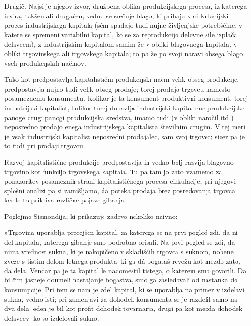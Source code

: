 \documentclass[kapital_02.tex]{subfiles}
\begin{document}
Drugič. Najsi je njegov izvor, družbena oblika produkcijskega procesa, iz katerega izvira, takšen ali drugačen, vedno se srečuje blago, ki prihaja v cirkulacijski proces industrijskega kapitala (s\`em spadajo tudi nujne življenjske potrebščine, v katere se spremeni variabilni kapital, ko se za reprodukcijo delovne sile izplača delavcem), z industrijskim \KPEstran kapitalom samim že v obliki blagovnega kapitala, v obliki trgovinskega ali trgovskega kapitala; to pa že po svoji naravi obsega blago vseh produkcijskih načinov.

Tako kot predpostavlja kapitalistični produkcijski način velik obseg produkcije, predpostavlja nujno tudi velik obseg prodaje; torej prodajo trgovcu namesto posameznemu konsumentu. Kolikor je ta konsument produktivni konsument, torej industrijski kapitalist, kolikor torej dobavlja industrijski kapital ene produkcijske panoge drugi panogi produkcijska sredstva, imamo tudi (v obliki naročil itd.) neposredno prodajo enega industrijskega kapitalista številnim drugim. V tej meri je vsak industrijski kapitalist neposredni prodajalec, sam svoj trgovec; sicer pa je to tudi pri prodaji trgovcu.

Razvoj kapitalistične produkcije predpostavlja in vedno bolj razvija blagovno trgovino kot funkcijo trgovskega kapitala. Tu pa tam jo zato vzamemo za ponazoritev posameznih strani kapitalističnega procesa cirkulacije; pri njegovi splošni analizi pa si zamišljamo, da poteka prodaja brez posredovanja trgovca, ker le-to prikriva različne pojave gibanja.

Poglejmo Sismondija, ki prikazuje zadevo nekoliko naivno:

»Trgovina uporablja precejšen kapital, za katerega se na prvi pogled zdi, da ni del kapitala, katerega gibanje smo podrobno orisali. Na prvi pogled se zdi, da nima vrednost sukna, ki je nakopičeno v skladiščih trgovca s suknom, nobene zveze s tistim delom letnega produkta, ki ga d\'a bogataš revežu kot mezdo zato, da dela. Vendar pa je ta kapital le nadomestil tistega, o katerem smo govorili. Da bi čim jasneje doumeli nastajanje bogastva, smo ga zasledovali od nastanka do konsumpcije. Pri tem se nam je zdel kapital, ki se uporablja na primer v izdelavi sukna, vedno isti; pri zamenjavi za dohodek konsumenta se je razdelil samo na dva dela: eden je bil kot profit dohodek tovarnarja, drugi pa kot mezda dohodek delavcev, ko so izdelovali sukno.
\end{document}
